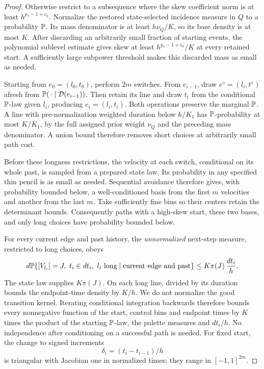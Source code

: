 \begin{proof}
Otherwise restrict to a subsequence where the skew coefficient
norm is at least \(h^{p_*-1+c_0}\).
Normalize the restored state-selected incidence measure in \(Q\)
to a probability \(\mathbb P\). Its mass denominator is at least
\(h\nu_Q/K\), so its base density is at most \(K\).
After discarding an arbitrarily small fraction of starting events,
the polynomial sublevel estimate gives skew at least
\(h^{p_*-1+c_0}/K\) at every retained start. A sufficiently large
subpower threshold makes this discarded mass as small as needed.

Starting from \(e_0=(l_0,t_0)\), perform \(2m\) switches.
From \(e_{i-1}\), draw \(e^\diamond=(l_i,t^\diamond)\) afresh
from \(\mathbb P(\,\cdot\mid\mathcal D(e_{i-1}))\).
Then retain its line and draw \(t_i\) from the conditional
\(\mathbb P\)-law given \(l_i\), producing \(e_i=(l_i,t_i)\).
Both operations preserve the marginal \(\mathbb P\).
A line with pre-normalization weighted duration below \(h/K_1\)
has \(\mathbb P\)-probability at most \(K/K_1\), by the full assigned
prior weight \(\nu_Q\) and the preceding mass denominator.
A union bound therefore removes short choices at arbitrarily
small path cost.

Before these longness restrictions, the velocity at each switch,
conditional on its whole past, is sampled from a prepared state
law. Its probability in any specified thin pencil is as small
as needed. Sequential avoidance therefore gives, with probability
bounded below, a well-conditioned basis from the first \(m\)
velocities and another from the last \(m\).
Take sufficiently fine bins so their centers retain the determinant
bounds. Consequently paths with a high-skew start, these two
bases, and only long choices have probability bounded below.

For every current edge and past history, the \emph{unnormalized}
next-step measure, restricted to long choices, obeys
\begin{equation}\label{a05:transition-domination}
 d\mathbb P\{[V_{l_i}]=J,\ t_i\in dt_i,\ l_i\text{ long}
                  \mid\text{current edge and past}\}
       \leq K\pi(J)\,\frac{dt_i}{h}.
\end{equation}
The state law supplies \(K\pi(J)\). On each long line,
 divided by its duration bounds the
endpoint-time density by \(K/h\). We do not normalize the good
transition kernel. Iterating conditional integration backwards
therefore bounds every nonnegative function of the start,
control bins and endpoint times by \(K\) times the product
of the starting \(\mathbb P\)-law, the palette measures and \(dt_i/h\).
No independence after conditioning on a successful path is needed.
For fixed start, the change to signed increments
\[
 \delta_i=(t_i-t_{i-1})/h
\]
is triangular with Jacobian one in normalized times; they range
in \([-1,1]^{2m}\).


\end{proof}
